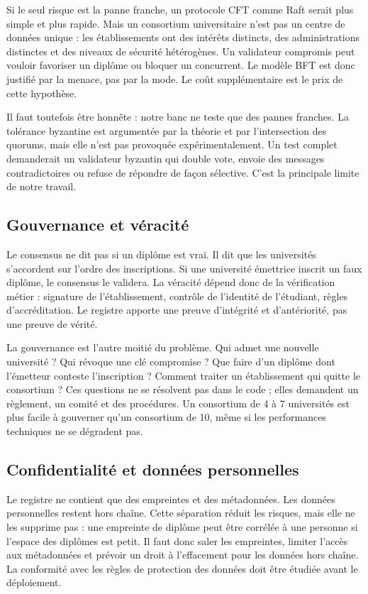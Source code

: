 \documentclass[conference]{IEEEtran}
\begin{document}
Si le seul risque est la panne franche, un protocole CFT comme Raft serait plus simple et plus rapide. Mais un consortium universitaire n'est pas un centre de données unique : les établissements ont des intérêts distincts, des administrations distinctes et des niveaux de sécurité hétérogènes. Un validateur compromis peut vouloir favoriser un diplôme ou bloquer un concurrent. Le modèle BFT est donc justifié par la menace, pas par la mode. Le coût supplémentaire est le prix de cette hypothèse.

Il faut toutefois être honnête : notre banc ne teste que des pannes franches. La tolérance byzantine est argumentée par la théorie et par l'intersection des quorums, mais elle n'est pas provoquée expérimentalement. Un test complet demanderait un validateur byzantin qui double vote, envoie des messages contradictoires ou refuse de répondre de façon sélective. C'est la principale limite de notre travail.

\subsection{Gouvernance et véracité}

Le consensus ne dit pas si un diplôme est vrai. Il dit que les universités s'accordent sur l'ordre des inscriptions. Si une université émettrice inscrit un faux diplôme, le consensus le validera. La véracité dépend donc de la vérification métier : signature de l'établissement, contrôle de l'identité de l'étudiant, règles d'accréditation. Le registre apporte une preuve d'intégrité et d'antériorité, pas une preuve de vérité.

La gouvernance est l'autre moitié du problème. Qui admet une nouvelle université ? Qui révoque une clé compromise ? Que faire d'un diplôme dont l'émetteur conteste l'inscription ? Comment traiter un établissement qui quitte le consortium ? Ces questions ne se résolvent pas dans le code ; elles demandent un règlement, un comité et des procédures. Un consortium de 4 à 7 universités est plus facile à gouverner qu'un consortium de 10, même si les performances techniques ne se dégradent pas.

\subsection{Confidentialité et données personnelles}

Le registre ne contient que des empreintes et des métadonnées. Les données personnelles restent hors chaîne. Cette séparation réduit les risques, mais elle ne les supprime pas : une empreinte de diplôme peut être corrélée à une personne si l'espace des diplômes est petit. Il faut donc saler les empreintes, limiter l'accès aux métadonnées et prévoir un droit à l'effacement pour les données hors chaîne. La conformité avec les règles de protection des données doit être étudiée avant le déploiement.
\end{document}

